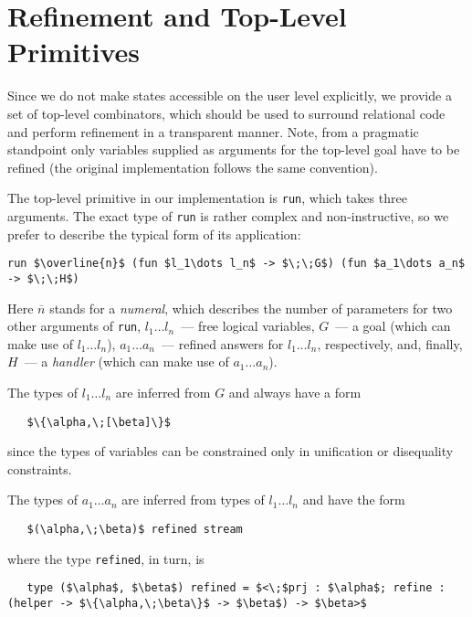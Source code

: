 \section{Refinement and Top-Level Primitives}
\label{refinement}

Since we do not make states accessible on the user level explicitly, we provide
a set of top-level combinators, which should be used to surround relational code
and perform refinement in a transparent manner. Note, from a pragmatic
standpoint only variables supplied as arguments for the top-level goal have
to be refined (the original \miniKanren implementation follows the same convention).

The top-level primitive in our implementation is \lstinline{run}, which takes three
arguments. The exact type of \lstinline{run} is rather complex and non-instructive,
so we prefer to describe the typical form of its application:

\begin{lstlisting}[mathescape=true]
   run $\overline{n}$ (fun $l_1\dots l_n$ -> $\;\;G$) (fun $a_1\dots a_n$ -> $\;\;H$)
\end{lstlisting}

Here $\overline{n}$ stands for a \emph{numeral}, which describes the number of
parameters for two other arguments of \lstinline{run}, \mbox{$l_1\dots l_n$}~---
free logical variables, $G$~--- a goal (which can make use of \mbox{$l_1\dots l_n$}),
\mbox{$a_1\dots a_n$}~--- refined answers for \mbox{$l_1\dots l_n$}, respectively, and,
finally, $H$~--- a \emph{handler} (which can make use of \mbox{$a_1\dots a_n$}).

The types of \mbox{$l_1\dots l_n$} are inferred from $G$ and always have a form

\begin{lstlisting}
   $\{\alpha,\;[\beta]\}$
\end{lstlisting}

since the types of variables can be constrained only in unification or disequality constraints.

The types of \mbox{$a_1\dots a_n$} are inferred from types of \mbox{$l_1\dots l_n$} and
have the form

\begin{lstlisting}
   $(\alpha,\;\beta)$ refined stream
\end{lstlisting}

where the type \lstinline{refined}, in turn, is

\begin{lstlisting}
   type ($\alpha$, $\beta$) refined = $<\;$prj : $\alpha$; refine : (helper -> $\{\alpha,\;\beta\}$ -> $\beta$) -> $\beta>$
\end{lstlisting}

